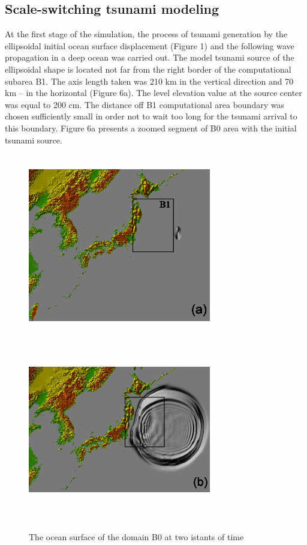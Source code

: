 \documentclass{aip-cp}
\begin{document}
\subsection{Scale-switching tsunami modeling}
At the first stage of the simulation, the process of tsunami generation by 
the ellipsoidal initial ocean surface displacement (Figure 1) and the 
following wave propagation in a deep ocean was carried out. The model 
tsunami source of the ellipsoidal shape is located not far from the right 
border of the computational subarea B1. The axis length taken was 210 km in 
the vertical direction and 70 km -- in the horizontal (Figure 6a). The level 
elevation value at the source center was equal to 200 cm. The distance off 
B1 computational area boundary was chosen sufficiently small in order not to 
wait too long for the tsunami arrival to this boundary. Figure 6a presents a 
zoomed segment of B0 area with the initial tsunami source. 

\begin{figure}[h!]
 \hspace*{3mm}
 \includegraphics[width=8cm,height=8cm]{art/Fig_06_a.png}
 \hfill
 \includegraphics[width=8cm,height=8cm]{art/Fig_06_b.png} \hspace*{3mm}
\\
\parbox[t]{0.45\textwidth}{\caption{The ocean surface of the domain B0
at two istants of time}} \hfill
\end{figure}
\end{document}
